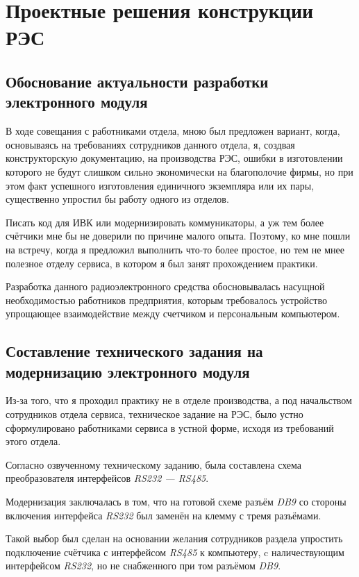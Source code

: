 \section{Проектные решения конструкции РЭС}

\subsection{Обоснование актуальности разработки электронного модуля}

В ходе совещания с работниками отдела,
мною был предложен вариант,
когда, основываясь на требованиях сотрудников данного
отдела, я, создвая конструкторскую документацию,
на производства РЭС, ошибки в изготовлении которого не будут
слишком сильно экономически на благополочие фирмы,
но при этом факт успешного изготовления
единичного экземпляра или их пары,
существенно упростил бы работу одного из отделов.

Писать код для ИВК или модернизировать коммуникаторы,
а уж тем более счётчики мне бы не доверили по причине
малого опыта. Поэтому, ко мне пошли на встречу, когда
я предложил выполнить что-то более простое,
но тем не мнее полезное отделу сервиса,
в котором я был занят прохождением практики.


Разработка данного радиоэлектронного средства обосновывалась
насущной необходимостью работников предприятия,
которым требовалось устройство упрощающее взаимодействие
между счетчиком и персональным компьютером.

\subsection{Составление технического задания на модернизацию электронного модуля}

Из-за того, 
что я проходил практику не в отделе производства,
а под начальством сотрудников отдела сервиса,
техническое задание на РЭС,
было устно сформулировано работниками сервиса
в устной форме,
исходя из требований этого отдела.

Согласно озвученному техническому заданию,
была составлена схема преобразователя интерфейсов
\textit{RS232 — RS485}.

Модернизация заключалась в том,
что на готовой схеме разъём \textit{DB9}
со стороны включения интерфейса \textit{RS232}
был заменён на клемму с тремя разъёмами.

Такой выбор был сделан на основании
желания сотрудников раздела
упростить подключение счётчика с интерфейсом \textit{RS485}
к компьютеру, c наличествующим интерфейсом \textit{RS232},
но не снабженного при том разъёмом \textit{DB9}.

